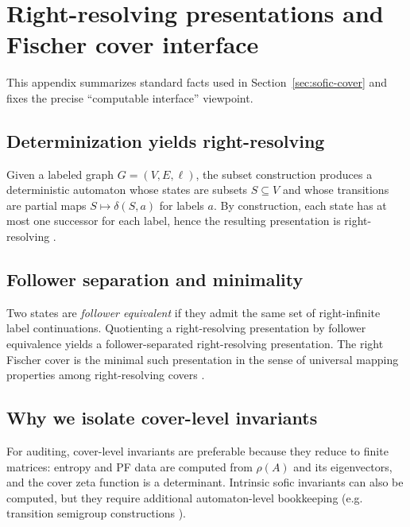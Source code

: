 \section{Right-resolving presentations and Fischer cover interface}\label{app:cover-details}

This appendix summarizes standard facts used in Section~\ref{sec:sofic-cover} and fixes the precise ``computable interface'' viewpoint.

\subsection{Determinization yields right-resolving}\label{app:det-right-resolving}
Given a labeled graph $G=(V,E,\ell)$, the subset construction produces a deterministic automaton whose states are subsets $S\subseteq V$ and whose transitions are partial maps $S\mapsto \delta(S,a)$ for labels $a$.
By construction, each state has at most one successor for each label, hence the resulting presentation is right-resolving \cite{LindMarcus1995,Kitchens1998SymbolicDynamics}.

\subsection{Follower separation and minimality}\label{app:follower-separation}
Two states are \emph{follower equivalent} if they admit the same set of right-infinite label continuations.
Quotienting a right-resolving presentation by follower equivalence yields a follower-separated right-resolving presentation.
The right Fischer cover is the minimal such presentation in the sense of universal mapping properties among right-resolving covers \cite{LindMarcus1995,Kitchens1998SymbolicDynamics}.

\subsection{Why we isolate cover-level invariants}\label{app:cover-audit}
For auditing, cover-level invariants are preferable because they reduce to finite matrices:
entropy and PF data are computed from $\rho(A)$ and its eigenvectors, and the cover zeta function is a determinant.
Intrinsic sofic invariants can also be computed, but they require additional automaton-level bookkeeping (e.g. transition semigroup constructions \cite{Nasu1995TextileSystems}).

